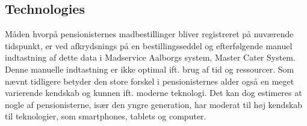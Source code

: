 \subsection{Technologies}
Måden hvorpå pensionisternes madbestillinger bliver registreret på nuværende tidspunkt, er ved afkrydsnings på en bestillingsseddel og efterfølgende manuel indtastning af dette data i Madservice Aalborgs system, Master Cater System.
Denne manuelle indtastning er ikke optimal ift. brug af tid og ressourcer.
Som nævnt tidligere betyder den store forskel i pensionisternes alder også en meget varierende kendskab og kunnen ift. moderne teknologi.
Det kan dog estimeres at nogle af pensionisterne, især den yngre generation, har moderat til høj kendskab til teknologier, som smartphones, tablets og computer. 

